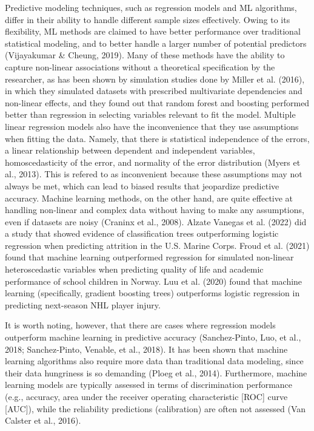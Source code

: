 \documentclass[
  man]{apa7}
\begin{document}
Predictive modeling techniques, such as regression models and ML algorithms, differ in their ability to handle different sample sizes effectively.
Owing to its flexibility, ML methods are claimed to have better performance over traditional statistical modeling, and to better handle a larger number of potential predictors (Vijayakumar \& Cheung, 2019).
Many of these methods have the ability to capture non-linear associations without a theoretical specification by the researcher, as has been shown by simulation studies done by Miller et al. (2016), in which they simulated datasets with prescribed multivariate dependencies and non-linear effects, and they found out that random forest and boosting performed better than regression in selecting variables relevant to fit the model.
Multiple linear regression models also have the inconvenience that they use assumptions when fitting the data.
Namely, that there is statistical independence of the errors, a linear relationship between dependent and independent variables, homoscedasticity of the error, and normality of the error distribution (Myers et al., 2013).
This is refered to as inconvenient because these assumptions may not always be met, which can lead to biased results that jeopardize predictive accuracy.
Machine learning methods, on the other hand, are quite effective at handling non-linear and complex data without having to make any assumptions, even if datasets are noisy (Craninx et al., 2008).
Alzate Vanegas et al. (2022) did a study that showed evidence of classification trees outperforming logistic regression when predicting attrition in the U.S.
Marine Corps.
Froud et al. (2021) found that machine learning outperformed regression for simulated non-linear heteroscedastic variables when predicting quality of life and academic performance of school children in Norway.
Luu et al. (2020) found that machine learning (specifically, gradient boosting trees) outperforms logistic regression in predicting next-season NHL player injury.

It is worth noting, however, that there are cases where regression models outperform machine learning in predictive accuracy (Sanchez-Pinto, Luo, et al., 2018; Sanchez-Pinto, Venable, et al., 2018). It has been shown that machine learning algorithms also require more data than traditional data modeling, since their data hungriness is so demanding (Ploeg et al., 2014).
Furthermore, machine learning models are typically assessed in terms of discrimination performance (e.g., accuracy, area under the receiver operating characteristic {[}ROC{]} curve {[}AUC{]}), while the reliability predictions (calibration) are often not assessed (Van Calster et al., 2016).
\end{document}
